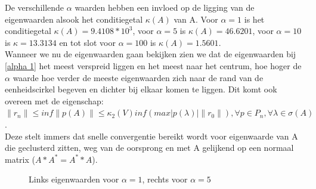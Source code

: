De verschillende $\alpha$ waarden hebben een invloed op de ligging van de eigenwaarden alsook het conditiegetal $\kappa(A)$ van A. Voor $\alpha = 1$ is het conditiegetal $\kappa(A) = 9.4108*10^3$, voor $\alpha = 5$ is $\kappa(A) = 46.6201$, voor $\alpha = 10$ is $\kappa = 13.3134$ en tot slot voor $\alpha = 100$ is $\kappa(A) = 1.5601$.\\[12pt]

Wanneer we nu de eigenwaarden gaan bekijken zien we dat de eigenwaarden bij \ref{alpha 1} het meest verspreid liggen en het meest naar het centrum, hoe hoger de $\alpha$ waarde hoe verder de meeste eigenwaarden zich naar de rand van de eenheidscirkel begeven en dichter bij elkaar komen te liggen. Dit komt ook overeen met de eigenschap:\\[12pt]
 $\|r_{n}\| \leq inf\|p(A)\| \leq \kappa_{2}(V) inf (max |p(\lambda)|\|r_{0}\|),\forall p\in P_{n}, \forall\lambda\in \sigma(A)$.\\[12pt]
 Deze stelt immers dat snelle convergentie bereikt wordt voor eigenwaarde van A die geclusterd zitten, weg van de oorsprong en met A gelijkend op een normaal matrix ($A*A^{*} = A^{*}*A$).

\begin{figure}[H]
  \centering
  \hfill
  \caption{Links eigenwaarden voor $\alpha = 1$, rechts voor $\alpha = 5$}
\end{figure}

